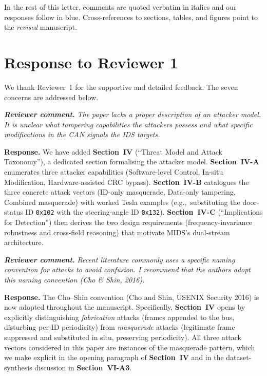 \documentclass[11pt,a4paper]{article}
\newcommand{\rcomment}[1]{%
  \par\medskip
  \begingroup
  \itshape
  \textbf{Reviewer comment.}\,\,#1
  \endgroup
  \par
}
\newcommand{\rresponse}[1]{%
  \par
  \begingroup
  \color{NavyBlue}
  \textbf{Response.}\,\,#1
  \endgroup
  \par\medskip
}
\newcommand{\xref}[1]{\textbf{#1}}
\begin{document}
In the rest of this letter, comments are quoted verbatim in
italics and our responses follow in blue. Cross-references to
sections, tables, and figures point to the \emph{revised}
manuscript.

\bigskip

\section*{Response to Reviewer 1}

We thank Reviewer~1 for the supportive and detailed feedback. The
seven concerns are addressed below.

\rcomment{The paper lacks a proper description of an attacker model.
It is unclear what tampering capabilities the attackers possess
and what specific modifications in the CAN signals the IDS targets.}
\rresponse{We have added \xref{Section~IV} (``Threat Model and
Attack Taxonomy''), a dedicated section formalising the attacker
model. \xref{Section~IV-A} enumerates three attacker capabilities
(Software-level Control, In-situ Modification, Hardware-assisted
CRC bypass). \xref{Section~IV-B} catalogues the three concrete
attack vectors (ID-only masquerade, Data-only tampering, Combined
masquerade) with worked Tesla examples (e.g.,~substituting the
door-status ID \texttt{0x102} with the steering-angle ID
\texttt{0x132}). \xref{Section~IV-C} (``Implications for
Detection'') then derives the two design requirements
(frequency-invariance robustness and cross-field reasoning) that
motivate MIDS's dual-stream architecture.}

\rcomment{Recent literature commonly uses a specific naming
convention for attacks to avoid confusion. I recommend that the
authors adopt this naming convention (Cho \& Shin, 2016).}
\rresponse{The Cho--Shin convention (Cho and Shin, USENIX Security 2016) is now adopted
throughout the manuscript. Specifically, \xref{Section~IV} opens
by explicitly distinguishing \emph{fabrication} attacks (frames
appended to the bus, disturbing per-ID periodicity) from
\emph{masquerade} attacks (legitimate frame suppressed and
substituted in situ, preserving periodicity). All three attack
vectors considered in this paper are instances of the masquerade
pattern, which we make explicit in the opening paragraph of
\xref{Section~IV} and in the dataset-synthesis discussion in
\xref{Section~VI-A3}.}
\end{document}
